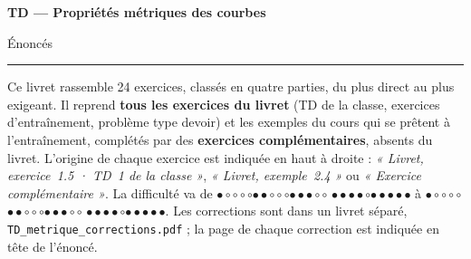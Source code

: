 \documentclass[a4paper,11pt]{article}
\numberwithin{equation}{section}
\numberwithin{figure}{section}
\numberwithin{table}{section}
\theoremstyle{enonce}
\theoremstyle{exemple}
\theoremstyle{remarque}
\newcommand{\niveau}[1]{{\color{Ocre}\footnotesize
  \ifcase#1\or$\bullet\circ\circ\circ\circ$\or$\bullet\bullet\circ\circ\circ$\or$\bullet\bullet\bullet\circ\circ$%
  \or$\bullet\bullet\bullet\bullet\circ$\or$\bullet\bullet\bullet\bullet\bullet$\fi}}
\begin{document}
\thispagestyle{plain}
{\sffamily\small\color{Gris}}\par\vspace{0.2em}
{\sffamily\bfseries\fontsize{26}{30}\selectfont\color{Ink}TD --- Propriétés métriques des courbes}\par\vspace{0.3em}
{\sffamily\Large\color{BleuMoyen}Énoncés}\par\vspace{0.4em}
{\color{Ocre}\rule{3.2cm}{1.4pt}}\par\vspace{0.8em}
{\small Ce livret rassemble 24 exercices, classés en quatre parties, du plus direct au plus exigeant.
Il reprend \textbf{tous les exercices du livret} (TD de la classe, exercices d'entraînement, problème type devoir) et les exemples
du cours qui se prêtent à l'entraînement, complétés par des \textbf{exercices complémentaires}, absents du livret.
L'origine de chaque exercice est indiquée en haut à droite : \emph{« Livret, exercice~1.5 · TD~1 de la classe »}, \emph{« Livret, exemple~2.4 »}
ou \emph{« Exercice complémentaire »}. La difficulté va de \niveau{1} à \niveau{5}.
Les corrections sont dans un livret séparé, \texttt{TD\_metrique\_corrections.pdf} ; la page de chaque correction est indiquée en tête de l'énoncé.}
\end{document}
